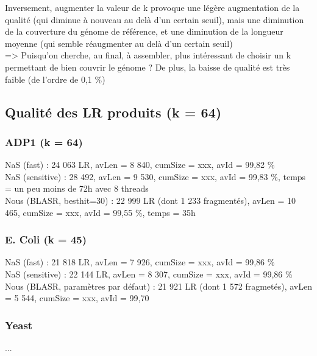 \documentclass[12pt]{article}
\begin{document}
Inversement, augmenter la valeur de k provoque une légère augmentation de la qualité (qui diminue à nouveau au delà d'un certain seuil), mais une
diminution de la couverture du génome de référence, et une diminution de la longueur moyenne (qui semble réaugmenter au delà d'un certain seuil) \\

=> Puisqu'on cherche, au final, à assembler, plus intéressant de choisir un k permettant de bien couvrir le génome ? De plus, la baisse de qualité est très faible (de l'ordre de 0,1 \%)

\subsection{Qualité des LR produits (k = 64)}

\subsubsection{ADP1 (k = 64)}

NaS (fast) : 24 063 LR, avLen = 8 840, cumSize = xxx, avId = 99,82 \% \\

NaS (sensitive) : 28 492, avLen = 9 530, cumSize = xxx, avId = 99,83 \%, temps = un peu moins de 72h avec 8 threads \\

Nous (BLASR, besthit=30) : 22 999 LR (dont 1 233 fragmentés), avLen = 10 465, cumSize = xxx, avId = 99,55 \%, temps = 35h 

\subsubsection{E. Coli (k = 45)}

NaS (fast) : 21 818 LR, avLen = 7 926, cumSize = xxx, avId = 99,86 \% \\

NaS (sensitive) : 22 144 LR, avLen = 8 307, cumSize = xxx, avId = 99,86 \% \\

Nous (BLASR, paramètres par défaut) : 21 921 LR (dont 1 572 fragmetés), avLen = 5 544, cumSize = xxx, avId = 99,70\\

\subsubsection{Yeast}

...
\end{document}

